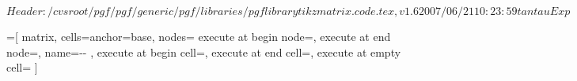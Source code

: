 %
%
%

\ProvidesFileRCS[v\pgfversion] $Header: /cvsroot/pgf/pgf/generic/pgf/libraries/pgflibrarytikzmatrix.code.tex,v 1.6 2007/06/21 10:23:59 tantau Exp $



=[%
   matrix,%
   cells={anchor=base},%
   nodes={%
     execute at begin node=,%
     execute at end node=,
     name=\tikzmatrixname-\the\pgfmatrixcurrentrow-\the\pgfmatrixcurrentcolumn%
   },
   execute at begin cell=\tikz@lib@matrix@start@cell,%
   execute at end cell=\tikz@lib@matrix@end@cell,%
   execute at empty cell=\tikz@lib@matrix@empty@cell
]

\def\tikz@lib@matrix@empty@cell{\iftikz@lib@matrix@empty\node{};\fi}

\newif\iftikz@lib@matrix@plain

\def\tikz@lib@matrix@start@cell{%
  \pgfutil@ifnextchar|{\tikz@lib@matrix@with@options}{\tikz@lib@matrix@normal@start@cell}}

\def\tikz@lib@matrix@with@options|#1|{\tikz@lib@matrix@plainfalse\node#1\bgroup\tikz@lib@matrix@startup}


\def\tikz@lib@matrix@normal@start@cell{\pgfutil@ifnextchar\let{\tikz@lib@matrix@check}{\tikz@lib@matrix@plainfalse\node\bgroup\tikz@lib@matrix@startup}}%

\def\tikz@lib@matrix@check#1{%
  \pgfutil@ifnextchar\tikz@signal@path{\tikz@lib@matrix@plaintrue\let}{\tikz@lib@matrix@plainfalse\node\bgroup\tikz@lib@matrix@startup\let}%
}
  
\def\tikz@lib@matrix@end@cell{%
  \iftikz@lib@matrix@plain%
  \else%
    \expandafter\egroup\expandafter;%
  \fi%
}

\def\tikz@lib@matrix@startup{%
  \pgfutil@ifnextchar\bgroup{%
    \let\tikz@lib@matrix@saved@eol=\\%
    \let\\=\pgfmatrixendrow%
    \afterassignment\tikz@lib@matrix@smuggle%
    \let\tikz@next}
  {\let\\=\pgfmatrixendrow}%
}
\def\tikz@lib@matrix@smuggle{%
  \bgroup%
  \let\\=\tikz@lib@matrix@saved@eol%
}


